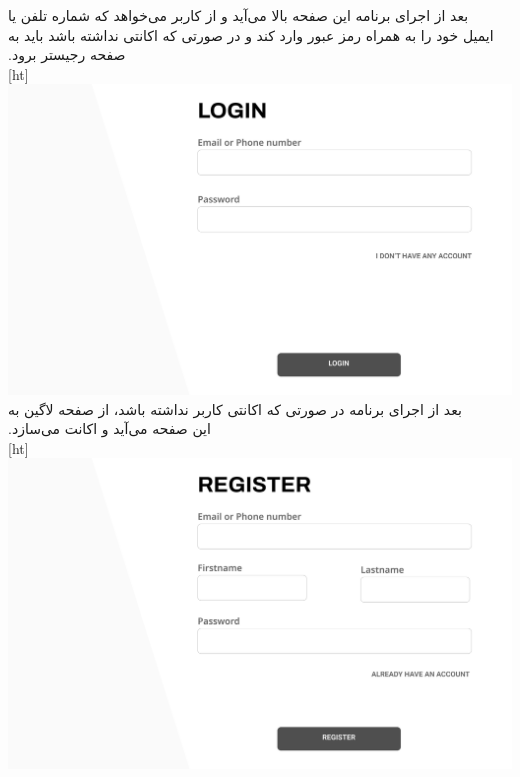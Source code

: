 ‫
‫
‫بعد از اجرای برنامه این صفحه بالا می‌آید و از کاربر می‌خواهد که شماره تلفن یا ایمیل خود را به همراه رمز عبور وارد کند و در صورتی که اکانتی نداشته باشد باید به صفحه رجیستر برود.
‫\\
‫[ht]
\includegraphics[scale=0.2]{figs/login_page.jpeg}
‫
‫
‫
‫
‫
‫
‫بعد از اجرای برنامه در صورتی که اکانتی کاربر نداشته باشد، از صفحه لاگین به این صفحه می‌آید و اکانت می‌سازد.
\\
‫[ht]
\includegraphics[scale=0.2]{figs/register_page.jpeg}
‫
‫
‫
\clearpage



